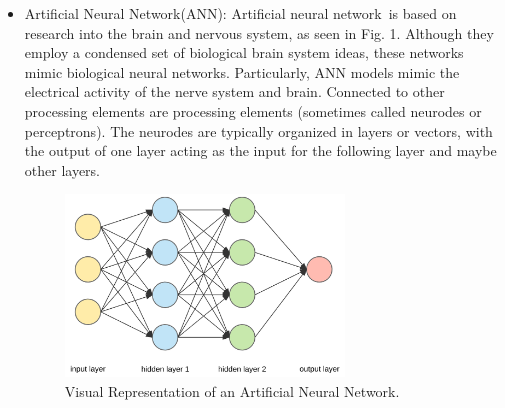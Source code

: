 \begin{itemize}
    
    \item Artificial Neural Network(ANN): Artificial neural network is based on research into the brain and nervous system, as seen in Fig. 1. Although they employ a condensed set of biological brain system ideas, these networks mimic biological neural networks. Particularly, ANN models mimic the electrical activity of the nerve system and brain. Connected to other processing elements are processing elements (sometimes called neurodes or perceptrons). The neurodes are typically organized in layers or vectors, with the output of one layer acting as the input for the following layer and maybe other layers.\cite{ann}
        \begin{figure}[H]
        \centering
        \includegraphics[width=0.7\textwidth]{./figure/chap 3/5.png}
        \caption{Visual Representation of an Artificial Neural Network.}
        \label{Fig 3.6}
        \end{figure}

\end{itemize}






